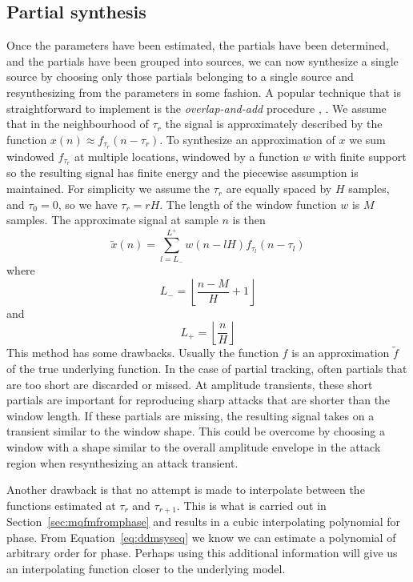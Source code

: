 \documentclass[letterpaper,12pt]{report}
\begin{document}
\subsection{Partial synthesis}

Once the parameters have been estimated, the partials have been determined, and
the partials have been grouped into sources, we can now synthesize a single
source by choosing only those partials belonging to a single source and
resynthesizing from the parameters in some fashion. A popular technique that is
straightforward to implement is the \textit{overlap-and-add} procedure
\cite{portnoff1976implementation}, \cite{moore1990elements}. We assume that in
the neighbourhood of $\tau_{r}$ the signal is approximately described by the
function $x(n) \approx f_{\tau_{r}}(n-\tau_{r})$. To synthesize an approximation of $x$
we sum windowed $f_{\tau_{r}}$ at multiple locations, windowed by a function $w$
with finite support so
the resulting signal has finite energy and the piecewise assumption is
maintained. For simplicity we assume the $\tau_{r}$ are equally spaced by $H$
samples, and $\tau_{0}=0$, so we have $\tau_{r} = rH$. The length of the window
function $w$ is $M$ samples. The approximate signal at sample $n$ is then
\[
    \tilde{x}(n) = \sum_{l=L_{-}}^{L^{+}} w(n-lH) f_{\tau_l}(n-\tau_l)
\]
where
\[
    L_{-} = \left\lfloor \frac{n-M}{H} + 1 \right\rfloor
\]
and
\[
    L_{+} = \left\lfloor \frac{n}{H} \right\rfloor
\]
This method has some drawbacks. Usually the function $f$ is an approximation
$\tilde{f}$ of the true underlying function. In the case of partial tracking,
often partials that are too short are discarded or missed. At amplitude
transients, these short partials are important for reproducing sharp attacks
that are shorter than the window length. If these partials are missing, the
resulting signal takes on a transient similar to the window shape. This could be
overcome by choosing a window with a shape similar to the overall amplitude
envelope in the attack region when resynthesizing an attack transient.

Another drawback is that no attempt is made to interpolate between the functions
estimated at $\tau_{r}$ and $\tau_{r+1}$. This is what is carried out in
Section~\ref{sec:mqfmfromphase} and results in a cubic interpolating polynomial
for phase. From Equation~\ref{eq:ddmsyseq} we know we can estimate a
polynomial of arbitrary order for phase. Perhaps using this additional
information will give us an interpolating function closer to the underlying
model.
\end{document}
